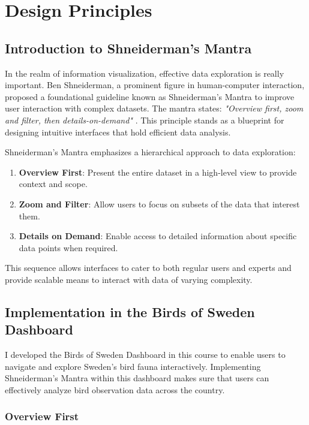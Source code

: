 \chapter{Design Principles}

\section{Introduction to Shneiderman's Mantra}

In the realm of information visualization, effective data exploration is really important. Ben Shneiderman, a prominent figure in human-computer interaction, proposed a foundational guideline known as Shneiderman's Mantra to improve user interaction with complex datasets. The mantra states: \textit{"Overview first, zoom and filter, then details-on-demand"} \cite{fitzgeraldSchneidermansMantra2016}. This principle stands as a blueprint for designing intuitive interfaces that hold efficient data analysis.

Shneiderman's Mantra emphasizes a hierarchical approach to data exploration:

\begin{enumerate} 
    \item \textbf{Overview First}: Present the entire dataset in a high-level view to provide context and scope. \item \textbf{Zoom and Filter}: Allow users to focus on subsets of the data that interest them. 
    \item \textbf{Details on Demand}: Enable access to detailed information about specific data points when required. 
\end{enumerate}

This sequence allows interfaces to cater to both regular users and experts and provide scalable means to interact with data of varying complexity.

\section{Implementation in the Birds of Sweden Dashboard}

I developed the Birds of Sweden Dashboard in this course to enable users to navigate and explore Sweden's bird fauna interactively. Implementing Shneiderman's Mantra within this dashboard makes sure that users can effectively analyze bird observation data across the country.

\subsection{Overview First}

